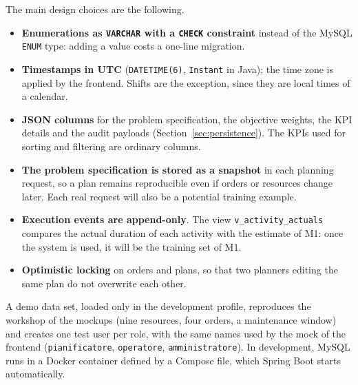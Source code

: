 The main design choices are the following.
\begin{itemize}
  \item \textbf{Enumerations as \texttt{VARCHAR} with a \texttt{CHECK} constraint} instead of the
        MySQL \texttt{ENUM} type: adding a value costs a one-line migration.
  \item \textbf{Timestamps in UTC} (\texttt{DATETIME(6)}, \texttt{Instant} in Java); the time
        zone is applied by the frontend. Shifts are the exception, since they are local times of
        a calendar.
  \item \textbf{JSON columns} for the problem specification, the objective weights, the KPI
        details and the audit payloads (Section~\ref{sec:persistence}). The KPIs used for sorting and
        filtering are ordinary columns.
  \item \textbf{The problem specification is stored as a snapshot} in each planning request, so a
        plan remains reproducible even if orders or resources change later. Each real request
        will also be a potential training example.
  \item \textbf{Execution events are append-only}. The view \texttt{v\_activity\_actuals}
        compares the actual duration of each activity with the estimate of M1: once the system
        is used, it will be the training set of M1.
  \item \textbf{Optimistic locking} on orders and plans, so that two planners editing the same
        plan do not overwrite each other.
\end{itemize}
A demo data set, loaded only in the development profile, reproduces the workshop of the mockups
(nine resources, four orders, a maintenance window) and creates one test user per role, with the
same names used by the mock of the frontend (\texttt{pianificatore}, \texttt{operatore},
\texttt{amministratore}). In development, MySQL runs in a Docker
container defined by a Compose file, which Spring Boot starts automatically.

